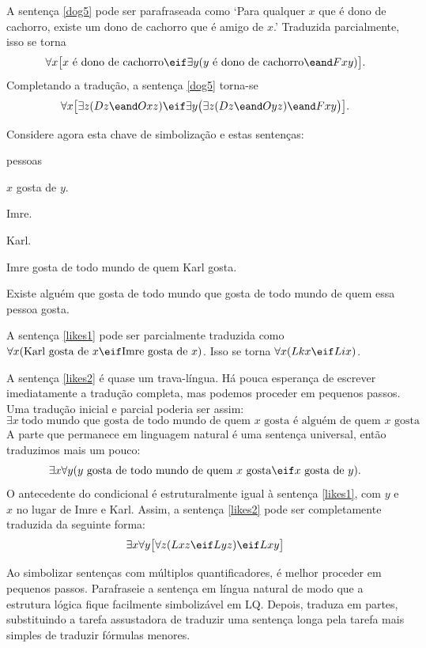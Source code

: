 A sentença \ref{dog5} pode ser parafraseada como `Para qualquer $x$ que é dono de cachorro, existe um dono de cachorro que é amigo de $x$.' Traduzida parcialmente, isso se torna
$$\forall x\bigl[\mbox{$x$ é dono de cachorro}\eif\exists y(\mbox{$y$ é dono de cachorro}\eand Fxy)\bigr].$$
Completando a tradução, a sentença \ref{dog5} torna-se
$$\forall x\bigl[\exists z(Dz \eand Oxz)\eif\exists y\bigl(\exists z(Dz \eand Oyz)\eand Fxy\bigr)\bigr].$$

Considere agora esta chave de simbolização e estas sentenças:
\begin{ekey}
\item[UD:] pessoas
\item[Lxy:] $x$ gosta de $y$.
\item[i:] Imre.
\item[k:] Karl.
\end{ekey}
\begin{earg}
\item[\ex{likes1}]Imre gosta de todo mundo de quem Karl gosta.
\item[\ex{likes2}]Existe alguém que gosta de todo mundo que gosta de todo mundo de quem essa pessoa gosta.
\end{earg}

A sentença \ref{likes1} pode ser parcialmente traduzida como $\forall x(\mbox{Karl gosta de $x$}\eif\mbox{Imre gosta de $x$})$. Isso se torna $\forall x(Lkx\eif Lix)$.

A sentença \ref{likes2} é quase um trava-língua. Há pouca esperança de escrever imediatamente a tradução completa, mas podemos proceder em pequenos passos. Uma tradução inicial e parcial poderia ser assim:
$$\exists x\ \mbox{todo mundo que gosta de todo mundo de quem $x$ gosta é alguém de quem $x$ gosta}$$
A parte que permanece em linguagem natural é uma sentença universal, então traduzimos mais um pouco:
$$\exists x\forall y(\mbox{$y$ gosta de todo mundo de quem $x$ gosta}\eif\mbox{$x$ gosta de $y$}).$$
O antecedente do condicional é estruturalmente igual à sentença \ref{likes1}, com $y$ e $x$ no lugar de Imre e Karl. Assim, a sentença \ref{likes2} pode ser completamente traduzida da seguinte forma:
$$\exists x\forall y\bigl[\forall z(Lxz \eif Lyz) \eif Lxy\bigr]$$

Ao simbolizar sentenças com múltiplos quantificadores, é melhor proceder em pequenos passos. Parafraseie a sentença em língua natural de modo que a estrutura lógica fique facilmente simbolizável em LQ. Depois, traduza em partes, substituindo a tarefa assustadora de traduzir uma sentença longa pela tarefa mais simples de traduzir fórmulas menores.


